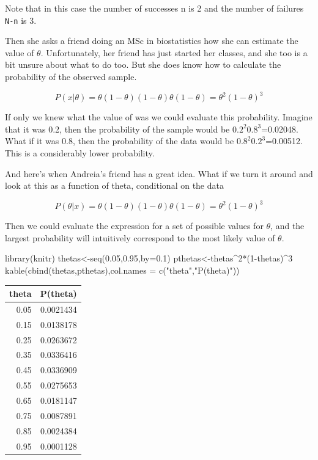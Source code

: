 \documentclass[
]{book}
\newenvironment{Shaded}{\begin{snugshade}}{\end{snugshade}}
\newcommand{\AttributeTok}[1]{\textcolor[rgb]{0.77,0.63,0.00}{#1}}
\newcommand{\DecValTok}[1]{\textcolor[rgb]{0.00,0.00,0.81}{#1}}
\newcommand{\FloatTok}[1]{\textcolor[rgb]{0.00,0.00,0.81}{#1}}
\newcommand{\FunctionTok}[1]{\textcolor[rgb]{0.00,0.00,0.00}{#1}}
\newcommand{\NormalTok}[1]{#1}
\newcommand{\OtherTok}[1]{\textcolor[rgb]{0.56,0.35,0.01}{#1}}
\newcommand{\SpecialCharTok}[1]{\textcolor[rgb]{0.00,0.00,0.00}{#1}}
\newcommand{\StringTok}[1]{\textcolor[rgb]{0.31,0.60,0.02}{#1}}
\begin{document}
Note that in this case the number of successes n is 2 and the number of failures \texttt{N-n} is 3.

Then she asks a friend doing an MSc in biostatistics how she can estimate the value of \(\theta\). Unfortunately, her friend has just started her classes, and she too is a bit unsure about what to do too. But she does know how to calculate the probability of the observed sample.

\[P(x|\theta)=\theta (1-\theta) (1-\theta) \theta (1-\theta)=\theta^2 (1-\theta)^3\]

If only we knew what the value of \theta was we could evaluate this probability. Imagine that it was 0.2, then the probability of the sample would be \(0.2^2 0.8^3\)=0.02048. What if it was 0.8, then the probability of the data would be \(0.8^2 0.2^3\)=0.00512. This is a considerably lower probability.

And here's when Andreia's friend has a great idea. What if we turn it around and look at this as a function of theta, conditional on the data

\[P(\theta|x)=\theta (1-\theta) (1-\theta) \theta (1-\theta)=\theta^2 (1-\theta)^3\]

Then we could evaluate the expression for a set of possible values for \(\theta\), and the largest probability will intuitively correspond to the most likely value of \(\theta\).

\begin{Shaded}
\begin{Highlighting}[]
\FunctionTok{library}\NormalTok{(knitr)}
\NormalTok{thetas}\OtherTok{\textless{}{-}}\FunctionTok{seq}\NormalTok{(}\FloatTok{0.05}\NormalTok{,}\FloatTok{0.95}\NormalTok{,}\AttributeTok{by=}\FloatTok{0.1}\NormalTok{)}
\NormalTok{pthetas}\OtherTok{\textless{}{-}}\NormalTok{thetas}\SpecialCharTok{\^{}}\DecValTok{2}\SpecialCharTok{*}\NormalTok{(}\DecValTok{1}\SpecialCharTok{{-}}\NormalTok{thetas)}\SpecialCharTok{\^{}}\DecValTok{3}
\FunctionTok{kable}\NormalTok{(}\FunctionTok{cbind}\NormalTok{(thetas,pthetas),}\AttributeTok{col.names =} \FunctionTok{c}\NormalTok{(}\StringTok{"theta"}\NormalTok{,}\StringTok{"P(theta)"}\NormalTok{))}
\end{Highlighting}
\end{Shaded}

\begin{tabular}{r|r}
\hline
theta & P(theta)\\
\hline
0.05 & 0.0021434\\
\hline
0.15 & 0.0138178\\
\hline
0.25 & 0.0263672\\
\hline
0.35 & 0.0336416\\
\hline
0.45 & 0.0336909\\
\hline
0.55 & 0.0275653\\
\hline
0.65 & 0.0181147\\
\hline
0.75 & 0.0087891\\
\hline
0.85 & 0.0024384\\
\hline
0.95 & 0.0001128\\
\hline
\end{tabular}
\end{document}
